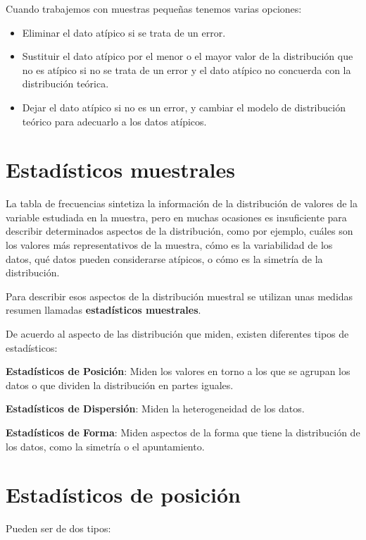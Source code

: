 \documentclass[
  a4paper,
]{scrreport}
\providecommand{\tightlist}{%
  \setlength{\itemsep}{0pt}\setlength{\parskip}{0pt}}\usepackage{longtable,booktabs,array}
\theoremstyle{plain}
\theoremstyle{definition}
\theoremstyle{definition}
\theoremstyle{remark}
\begin{document}
Cuando trabajemos con muestras pequeñas tenemos varias opciones:

\begin{itemize}
\tightlist
\item
  Eliminar el dato atípico si se trata de un error.
\item
  Sustituir el dato atípico por el menor o el mayor valor de la
  distribución que no es atípico si no se trata de un error y el dato
  atípico no concuerda con la distribución teórica.
\item
  Dejar el dato atípico si no es un error, y cambiar el modelo de
  distribución teórico para adecuarlo a los datos atípicos.
\end{itemize}

\section{Estadísticos muestrales}\label{estaduxedsticos-muestrales}

La tabla de frecuencias sintetiza la información de la distribución de
valores de la variable estudiada en la muestra, pero en muchas ocasiones
es insuficiente para describir determinados aspectos de la distribución,
como por ejemplo, cuáles son los valores más representativos de la
muestra, cómo es la variabilidad de los datos, qué datos pueden
considerarse atípicos, o cómo es la simetría de la distribución.

Para describir esos aspectos de la distribución muestral se utilizan
unas medidas resumen llamadas \textbf{estadísticos muestrales}.

De acuerdo al aspecto de las distribución que miden, existen diferentes
tipos de estadísticos:

\textbf{Estadísticos de Posición}: Miden los valores en torno a los que
se agrupan los datos o que dividen la distribución en partes iguales.

\textbf{Estadísticos de Dispersión}: Miden la heterogeneidad de los
datos.

\textbf{Estadísticos de Forma}: Miden aspectos de la forma que tiene la
distribución de los datos, como la simetría o el apuntamiento.

\section{Estadísticos de posición}\label{estaduxedsticos-de-posiciuxf3n}

Pueden ser de dos tipos:
\end{document}

